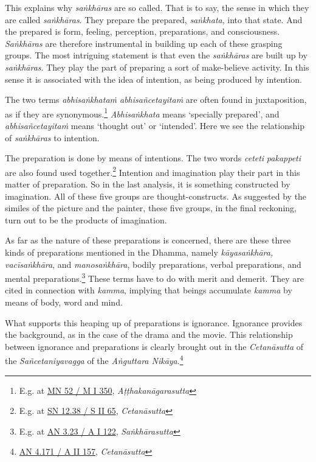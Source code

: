 This explains why \emph{saṅkhāras} are so called. That is to say, the sense in which they are called \emph{saṅkhāras}. They prepare the prepared, \emph{saṅkhata}, into that state. And the prepared is form, feeling, perception, preparations, and consciousness. \emph{Saṅkhāras} are therefore instrumental in building up each of these grasping groups. The most intriguing statement is that even the \emph{saṅkhāras} are built up by \emph{saṅkhāras}. They play the part of preparing a sort of make-believe activity. In this sense it is associated with the idea of intention, as being produced by intention.

The two terms \emph{abhisaṅkhataṁ abhisañcetayitaṁ} are often found in juxtaposition, as if they are synonymous.\footnote{E.g. at \href{https://suttacentral.net/mn52/pli/ms}{MN 52 / M I 350}, \emph{Aṭṭhakanāgarasutta}} \emph{Abhisaṅkhata} means `specially prepared', and \emph{abhisañcetayitaṁ} means `thought out' or `intended'. Here we see the relationship of \emph{saṅkhāras} to intention.

The preparation is done by means of intentions. The two words \emph{ceteti} \emph{pakappeti} are also found used together.\footnote{E.g. at \href{https://suttacentral.net/sn12.38/pli/ms}{SN 12.38 / S II 65}, \emph{Cetanāsutta}} Intention and imagination play their part in this matter of preparation. So in the last analysis, it is something constructed by imagination. All of these five groups are thought-constructs. As suggested by the similes of the picture and the painter, these five groups, in the final reckoning, turn out to be the products of imagination.

As far as the nature of these preparations is concerned, there are these three kinds of preparations mentioned in the Dhamma, namely \emph{kāyasaṅkhāra, vacīsaṅkhāra}, and \emph{manosaṅkhāra}, bodily preparations, verbal preparations, and mental preparations.\footnote{E.g. at \href{https://suttacentral.net/an3.23/pli/ms}{AN 3.23 / A I 122}, \emph{Saṅkhārasutta}} These terms have to do with merit and demerit. They are cited in connection with \emph{kamma}, implying that beings accumulate \emph{kamma} by means of body, word and mind.

What supports this heaping up of preparations is ignorance. Ignorance provides the background, as in the case of the drama and the movie. This relationship between ignorance and preparations is clearly brought out in the \emph{Cetanāsutta} of the \emph{Sañcetaniyavagga} of the \emph{Aṅguttara Nikāya}.\footnote{\href{https://suttacentral.net/an4.171/pli/ms}{AN 4.171 / A II 157}, \emph{Cetanāsutta}}

